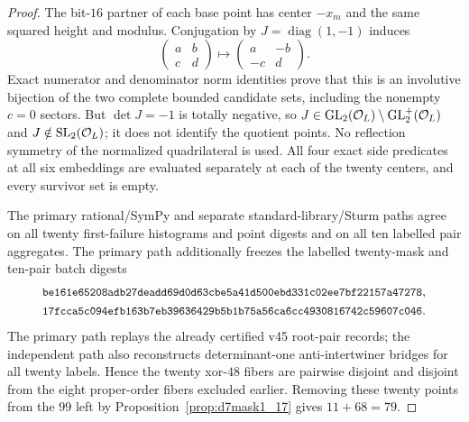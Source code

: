 \begin{proof}
The bit-$16$ partner of each base point has center $-x_m$ and the same squared
height and modulus. Conjugation by $J=\operatorname{diag}(1,-1)$ induces
\[
 \begin{pmatrix}a&b\\c&d\end{pmatrix}
 \longmapsto
 \begin{pmatrix}a&-b\\-c&d\end{pmatrix}.
\]
Exact numerator and denominator norm identities prove that this is an
involutive bijection of the two complete bounded candidate sets, including
the nonempty $c=0$ sectors. But $\det J=-1$ is totally negative, so
$J\in\operatorname{GL}_2(\mathcal O_L)\setminus\operatorname{GL}_2^+(\mathcal O_L)$ and $J\notin\operatorname{SL}_2(\mathcal O_L)$; it does not
identify the quotient points. No reflection symmetry of the normalized
quadrilateral is used. All four exact side predicates at all six embeddings
are evaluated separately at each of the twenty centers, and every survivor
set is empty.

The primary rational/SymPy and separate standard-library/Sturm paths agree on
all twenty first-failure histograms and point digests and on all ten labelled
pair aggregates. The primary path additionally freezes the labelled
twenty-mask and ten-pair batch digests
\[
\begin{gathered}
\digest{be161e65208adb27deadd69d0d63cbe5}{a41d500ebd331c02ee7bf22157a47278},\\
\digest{17fcca5c094efb163b7eb39636429b5b}{1b75a56ca6cc4930816742c59607c046}.
\end{gathered}
\]
The primary path replays the already certified v45 root-pair records; the
independent path also reconstructs determinant-one anti-intertwiner bridges
for all twenty labels. Hence the twenty xor-$48$ fibers are pairwise disjoint
and disjoint from the eight proper-order fibers excluded earlier. Removing
these twenty points from the $99$ left by
Proposition~\ref{prop:d7mask1_17} gives $11+68=79$.
\end{proof}


